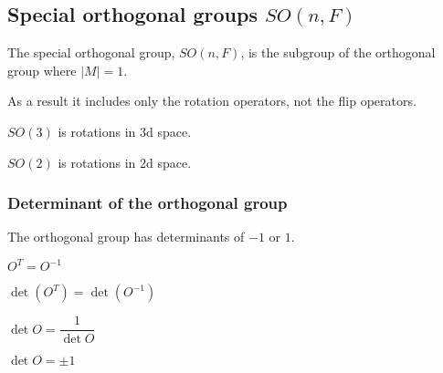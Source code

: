 
\subsection{Special orthogonal groups \(SO(n, F)\)}

The special orthogonal group, \(SO(n,F)\), is the subgroup of the orthogonal group where \(|M|=1\).

As a result it includes only the rotation operators, not the flip operators.

\(SO(3)\) is rotations in 3d space.

\(SO(2)\) is rotations in 2d space.

\subsubsection{Determinant of the orthogonal group}

The orthogonal group has determinants of \(-1\) or \(1\).

\(O^T=O^{-1}\)

\(\det (O^T)=\det (O^{-1})\)

\(\det O=\dfrac{1}{\det O}\)

\(\det O=\pm 1\)

